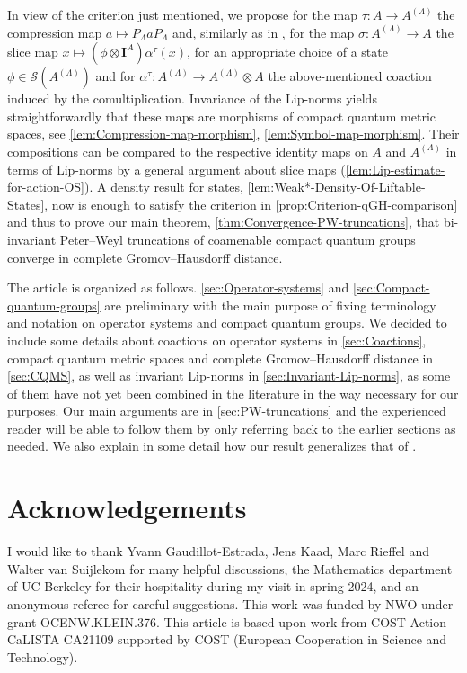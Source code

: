 \documentclass{amsart}
\theoremstyle{plain}
\theoremstyle{definition}
\theoremstyle{remark}
\begin{document}
	In view of the criterion just mentioned, we propose for the map $\tau : A \rightarrow A^{(\Lambda)}$ the compression map $a \mapsto P_\Lambda a P_\Lambda$ and, similarly as in \cite{GEvS23}, for the map $\sigma : A^{(\Lambda)} \rightarrow A$ the slice map $x \mapsto (\phi \otimes \mathbf{I}^A) \alpha^\tau(x)$, for an appropriate choice of a state $\phi \in \mathcal{S}(A^{(\Lambda)})$ and for $\alpha^\tau : A^{(\Lambda)} \rightarrow A^{(\Lambda)} \otimes A$ the above-mentioned coaction induced by the comultiplication.
	Invariance of the Lip-norms yields straightforwardly that these maps are morphisms of compact quantum metric spaces, see \autoref{lem:Compression-map-morphism}, \autoref{lem:Symbol-map-morphism}.
	Their compositions can be compared to the respective identity maps on $A$ and $A^{(\Lambda)}$ in terms of Lip-norms by a general argument about slice maps (\autoref{lem:Lip-estimate-for-action-OS}).
	A density result for states, \autoref{lem:Weak*-Density-Of-Liftable-States}, now is enough to satisfy the criterion in \autoref{prop:Criterion-qGH-comparison} and thus to prove our main theorem, \autoref{thm:Convergence-PW-truncations}, that bi-invariant Peter--Weyl truncations of coamenable compact quantum groups converge in complete Gromov--Hausdorff distance.
	
	The article is organized as follows.
	\autoref{sec:Operator-systems} and \autoref{sec:Compact-quantum-groups} are preliminary with the main purpose of fixing terminology and notation on operator systems and compact quantum groups. 
	We decided to include some details about coactions on operator systems in \autoref{sec:Coactions}, compact quantum metric spaces and complete Gromov--Hausdorff distance in \autoref{sec:CQMS}, as well as invariant Lip-norms in \autoref{sec:Invariant-Lip-norms}, as some of them have not yet been combined in the literature in the way necessary for our purposes.
	Our main arguments are in \autoref{sec:PW-truncations} and the experienced reader will be able to follow them by only referring back to the earlier sections as needed.
	We also explain in some detail how our result generalizes that of \cite{GEvS23}.
	
	
	\section*{Acknowledgements}
	
	I would like to thank Yvann Gaudillot-Estrada, Jens Kaad, Marc Rieffel and Walter van Suijlekom for many helpful discussions, the Mathematics department of UC Berkeley for their hospitality during my visit in spring 2024, and an anonymous referee for careful suggestions.
	This work was funded by NWO under grant OCENW.KLEIN.376.
	This article is based upon work from COST Action CaLISTA CA21109 supported by COST (European Cooperation in Science and Technology).
	
\end{document}
